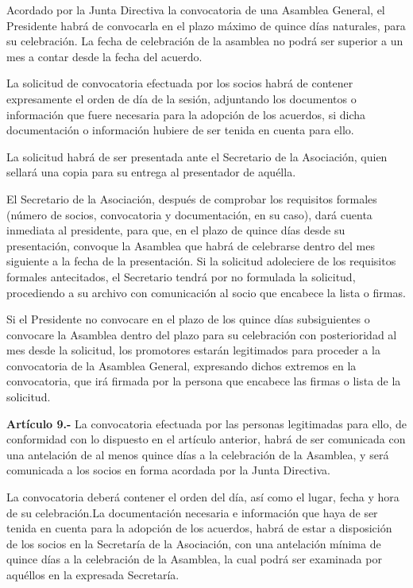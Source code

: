 \documentclass[a4paper,12pt]{article}
\begin{document}
\begin{onehalfspace}
Acordado por la Junta Directiva la convocatoria de una Asamblea General, el Presidente habr\'a de convocarla en el plazo m\'aximo de quince d\'ias naturales, para su celebraci\'on. La fecha de celebraci\'on de la asamblea no podr\'a ser superior a un mes a contar desde la fecha del acuerdo.

La solicitud de convocatoria efectuada por los socios habr\'a de contener expresamente el orden de d\'ia de la sesi\'on, adjuntando los documentos o informaci\'on que fuere necesaria para la adopci\'on de los acuerdos, si dicha documentaci\'on o informaci\'on hubiere de ser tenida en cuenta para ello.

La solicitud habr\'a de ser presentada ante el Secretario de la Asociaci\'on, quien sellar\'a una copia para su entrega al presentador de aqu\'ella.

El Secretario de la Asociaci\'on, despu\'es de comprobar los requisitos formales (n\'umero de socios, convocatoria y documentaci\'on, en su caso), dar\'a cuenta inmediata al presidente, para que, en el plazo de quince d\'ias desde su presentaci\'on, convoque la Asamblea que habr\'a de celebrarse dentro del mes siguiente a la fecha de la presentaci\'on. Si la solicitud adoleciere de los requisitos formales antecitados, el Secretario tendr\'a por no formulada la solicitud, procediendo a su archivo con comunicaci\'on al socio que encabece la lista o firmas.

Si el Presidente no convocare en el plazo de los quince d\'ias subsiguientes o convocare la Asamblea dentro del plazo para su celebraci\'on con posterioridad al mes desde la solicitud, los promotores estar\'an legitimados para proceder a la convocatoria de la Asamblea General, expresando dichos extremos en la convocatoria, que ir\'a firmada por la persona que encabece las firmas o lista de la solicitud.

\bigskip\bigskip

\textbf{Art\'iculo 9.-} La convocatoria efectuada por las personas legitimadas para ello, de conformidad con lo dispuesto en el art\'iculo anterior, habr\'a de ser comunicada con una antelaci\'on de al menos quince d\'ias a la celebraci\'on de la Asamblea, y ser\'a comunicada a los socios en forma acordada por la Junta Directiva.

La convocatoria deber\'a contener el orden del d\'ia, as\'i como el lugar, fecha y hora de su celebraci\'on.La documentaci\'on necesaria e informaci\'on que haya de ser tenida en cuenta para la adopci\'on de los acuerdos, habr\'a de estar a disposici\'on de los socios en la Secretar\'ia de la Asociaci\'on, con una antelaci\'on m\'inima de quince d\'ias a la celebraci\'on de la Asamblea, la cual podr\'a ser examinada por aqu\'ellos en la expresada Secretar\'ia.


\end{onehalfspace}
\end{document}

